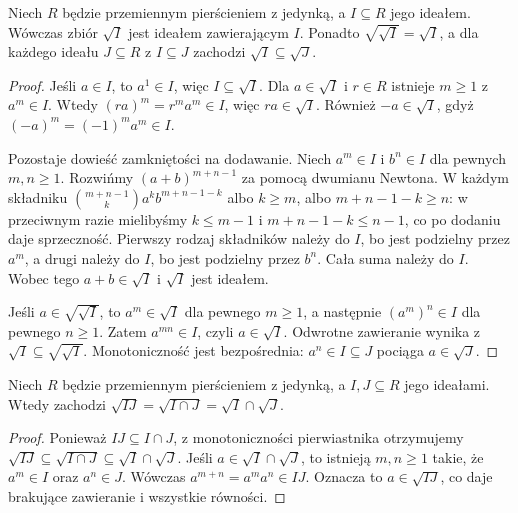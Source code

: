 \begin{twierdzenie}
\label{aa:tw:radical-ideal}
Niech $R$ będzie przemiennym pierścieniem z jedynką,
a $I\subseteq R$ jego ideałem. Wówczas zbiór $\sqrt I$
jest ideałem zawierającym $I$.
Ponadto $\sqrt{\sqrt I}=\sqrt I$, a dla każdego
ideału $J\subseteq R$ z $I\subseteq J$ zachodzi
$\sqrt I\subseteq\sqrt J$.
\end{twierdzenie}
\begin{proof}
Jeśli $a\in I$, to $a^1\in I$, więc $I\subseteq\sqrt I$.
Dla $a\in\sqrt I$ i $r\in R$ istnieje $m\ge1$ z
$a^m\in I$. Wtedy $(ra)^m=r^ma^m\in I$,
więc $ra\in\sqrt I$. Również $-a\in\sqrt I$, gdyż
$(-a)^m=(-1)^ma^m\in I$.

Pozostaje dowieść zamkniętości na dodawanie.
Niech $a^m\in I$ i $b^n\in I$ dla pewnych $m,n\ge1$.
Rozwińmy $(a+b)^{m+n-1}$ za pomocą dwumianu Newtona.
W każdym składniku $\binom{m+n-1}{k}a^k b^{m+n-1-k}$
albo $k\ge m$, albo $m+n-1-k\ge n$: w przeciwnym
razie mielibyśmy $k\le m-1$ i
$m+n-1-k\le n-1$, co po dodaniu daje sprzeczność.
Pierwszy rodzaj składników należy do $I$, bo jest
podzielny przez $a^m$, a drugi należy do $I$, bo jest
podzielny przez $b^n$. Cała suma należy do $I$.
Wobec tego $a+b\in\sqrt I$ i $\sqrt I$ jest ideałem.

Jeśli $a\in\sqrt{\sqrt I}$, to $a^m\in\sqrt I$
dla pewnego $m\ge1$, a następnie $(a^m)^n\in I$
dla pewnego $n\ge1$. Zatem $a^{mn}\in I$,
czyli $a\in\sqrt I$. Odwrotne zawieranie wynika
z $\sqrt I\subseteq\sqrt{\sqrt I}$. Monotoniczność
jest bezpośrednia: $a^n\in I\subseteq J$
pociąga $a\in\sqrt J$.
\end{proof}

\begin{twierdzenie}
\label{aa:tw:radical-product}
Niech $R$ będzie przemiennym pierścieniem z jedynką,
a $I,J\subseteq R$ jego ideałami. Wtedy zachodzi
$\sqrt{IJ}=\sqrt{I\cap J}=\sqrt I\cap\sqrt J$.
\end{twierdzenie}
\begin{proof}
Ponieważ $IJ\subseteq I\cap J$, z monotoniczności
pierwiastnika otrzymujemy
$\sqrt{IJ}\subseteq\sqrt{I\cap J}\subseteq\sqrt I\cap\sqrt J$.
Jeśli $a\in\sqrt I\cap\sqrt J$, to istnieją
$m,n\ge1$ takie, że $a^m\in I$ oraz $a^n\in J$.
Wówczas $a^{m+n}=a^m a^n\in IJ$. Oznacza to
$a\in\sqrt{IJ}$, co daje brakujące zawieranie
i wszystkie równości.
\end{proof}

